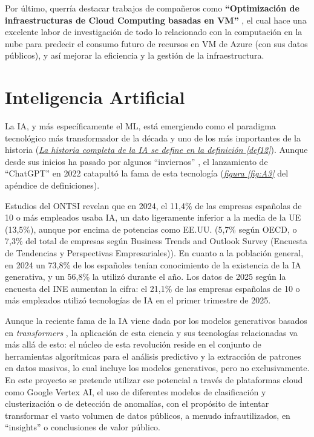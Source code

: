 Por último, querría destacar trabajos de compañeros como \textbf{``Optimización de infraestructuras de Cloud Computing basadas en VM''} \citep{sanchez2023optimizacion}, el cual hace una excelente labor de investigación de todo lo relacionado con la computación en la nube para predecir el consumo futuro de recursos en VM de Azure (con sus datos públicos), y así mejorar la eficiencia y la gestión de la infraestructura.

\section{Inteligencia Artificial}
\label{sec:EstudiosIA}

La IA, y más específicamente el ML, está emergiendo como el paradigma tecnológico más transformador de la década y uno de los más importantes de la historia (\hyperref[def12]{\textit{La historia completa de la IA se define en la definición \ref*{def12}}}). Aunque desde sus inicios ha pasado por algunos ``inviernos'' \citep{Cheok2023AIHistory}, el lanzamiento de ``ChatGPT'' en 2022 catapultó la fama de esta tecnología (\hyperref[figura_A3]{\textit{figura \ref{fig:A3}}} del apéndice de definiciones).

Estudios del ONTSI \citep{ontsi2025indicadores} revelan que en 2024, el 11,4\% de las empresas españolas de 10 o más empleados usaba IA, un dato ligeramente inferior a la media de la UE (13,5\%), aunque por encima de potencias como EE.UU. (5,7\% según OECD, o 7,3\% del total de empresas según Business Trends and Outlook Survey (Encuesta de Tendencias y Perspectivas Empresariales)). En cuanto a la población general, en 2024 un 73,8\% de los españoles tenían conocimiento de la existencia de la IA generativa, y un 56,8\% la utilizó durante el año. Los datos de 2025 según la encuesta del INE \citep{INE2025TIC} aumentan la cifra: el 21,1\% de las empresas españolas de 10 o más empleados utilizó tecnologías de IA en el primer trimestre de 2025.

Aunque la reciente fama de la IA viene dada por los modelos generativos basados en \textit{transformers} \citep{vaswani2017attention}, la aplicación de esta ciencia y sus tecnologías relacionadas va más allá de esto: el núcleo de esta revolución reside en el conjunto de herramientas algorítmicas para el análisis predictivo y la extracción de patrones en datos masivos, lo cual incluye los modelos generativos, pero no exclusivamente. En este proyecto se pretende utilizar ese potencial a través de plataformas cloud como Google Vertex AI, el uso de diferentes modelos de clasificación y clusterización o de detección de anomalías, con el propósito de intentar transformar el vasto volumen de datos públicos, a menudo infrautilizados, en ``insights'' o conclusiones de valor público.

